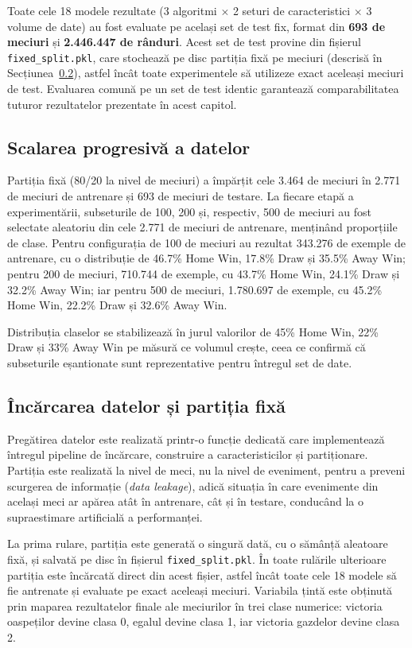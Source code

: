 Toate cele 18 modele rezultate (3 algoritmi $\times$ 2 seturi de
caracteristici $\times$ 3 volume de date) au fost evaluate pe același set
de test fix, format din \textbf{693 de meciuri} și \textbf{2.446.447 de
rânduri}. Acest set de test provine din fișierul \texttt{fixed\_split.pkl},
care stochează pe disc partiția fixă pe meciuri (descrisă în
Secțiunea~\ref{sec:split}), astfel încât toate experimentele să utilizeze
exact aceleași meciuri de test. Evaluarea comună pe un set de test identic
garantează comparabilitatea tuturor rezultatelor prezentate în acest
capitol.

\subsection{Scalarea progresivă a datelor}

Partiția fixă (80/20 la nivel de meciuri) a împărțit cele 3.464 de meciuri
în 2.771 de meciuri de antrenare și 693 de meciuri de testare. La fiecare
etapă a experimentării, subseturile de 100, 200 și, respectiv, 500 de
meciuri au fost selectate aleatoriu din cele 2.771 de meciuri de antrenare,
menținând proporțiile de clase. Pentru configurația de 100 de meciuri au
rezultat 343.276 de exemple de antrenare, cu o distribuție de 46.7\% Home
Win, 17.8\% Draw și 35.5\% Away Win; pentru 200 de meciuri, 710.744 de
exemple, cu 43.7\% Home Win, 24.1\% Draw și 32.2\% Away Win; iar pentru 500
de meciuri, 1.780.697 de exemple, cu 45.2\% Home Win, 22.2\% Draw și 32.6\%
Away Win.

Distribuția claselor se stabilizează în jurul valorilor de 45\% Home Win,
22\% Draw și 33\% Away Win pe măsură ce volumul crește, ceea ce confirmă că
subseturile eșantionate sunt reprezentative pentru întregul set de date.

\subsection{Încărcarea datelor și partiția fixă}
\label{sec:split}

Pregătirea datelor este realizată printr-o funcție dedicată care
implementează întregul pipeline de încărcare, construire a
caracteristicilor și partiționare. Partiția este realizată la nivel de
meci, nu la nivel de eveniment, pentru a preveni scurgerea de informație
(\textit{data leakage}), adică situația în care evenimente din același meci
ar apărea atât în antrenare, cât și în testare, conducând la o supraestimare
artificială a performanței.

La prima rulare, partiția este generată o singură dată, cu o sămânță
aleatoare fixă, și salvată pe disc în fișierul \texttt{fixed\_split.pkl}.
În toate rulările ulterioare partiția este încărcată direct din acest
fișier, astfel încât toate cele 18 modele să fie antrenate și evaluate pe
exact aceleași meciuri. Variabila țintă este obținută prin maparea
rezultatelor finale ale meciurilor în trei clase numerice: victoria
oaspeților devine clasa 0, egalul devine clasa 1, iar victoria gazdelor
devine clasa 2.

